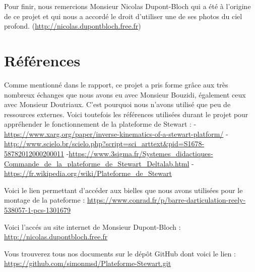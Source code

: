 \documentclass[a4paper,12pt]{article}
\begin{document}
\medskip

Pour finir, nous remercions Monsieur Nicolas Dupont-Bloch qui a été à l'origine de ce projet et qui nous a accordé le droit d'utiliser une de ses photos du ciel profond. (\url{http://nicolas.dupontbloch.free.fr})



\newpage
\section{Références}

Comme mentionné dans le rapport, ce projet a pris forme grâce aux très nombreux échanges que nous avons eu avec Monsieur Bouzidi, également ceux avec Monsieur Doutriaux. 
C'est pourquoi nous n'avons utilisé que peu de ressources externes. 
Voici toutefois les références utilisées durant le projet pour appréhender le fonctionnement de la plateforme de Stewart : 
\newline
-\url{https://www.xarg.org/paper/inverse-kinematics-of-a-stewart-platform/} 
\newline
-\url{http://www.scielo.br/scielo.php?script=sci_arttext&pid=S1678-58782012000200011}
\newline
-\url{https://www.3sigma.fr/Systemes_didactiques-Commande_de_la_plateforme_de_Stewart_Deltalab.html} 
\newline
-\url{https://fr.wikipedia.org/wiki/Plateforme_de_Stewart}

\bigskip

Voici le lien permettant d'accéder aux bielles que nous avons utilisées pour le montage de la pateforme :
\newline
\url{https://www.conrad.fr/p/barre-darticulation-reely-538057-1-pcs-1301679}

\bigskip

Voici l'accés au site internet de Monsieur Dupont-Bloch : 
\newline
\url{http://nicolas.dupontbloch.free.fr}

\bigskip

Vous trouverez tous nos documents sur le dépôt GitHub dont voici le lien :
\newline
\url{https://github.com/simonmsd/Plateforme-Stewart.git}





\end{document}
